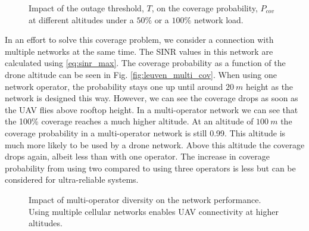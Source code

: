 \documentclass[conference,twocolumn,a4paper]{IEEEtran}
\begin{document}
\begin{figure}
	\centering
	 \resizebox{0.9\linewidth}{!}{
	
	}
	\caption{Impact of the outage threshold, $T$, on the coverage probability, $P_{cov}$ at different altitudes under a $50\%$ or a $100\%$ network load.}
	\label{fig:leuven_cov_vs_threshold}
\end{figure}

\par In an effort to solve this coverage problem, we consider a connection with multiple networks at the same time. The SINR values in this network are calculated using \eqref{eq:sinr_max}.
The coverage probability as a function of the drone altitude can be seen in Fig. \ref{fig:leuven_multi_cov}. When using one network operator, the probability stays one up until around $20~m$ height as the network is designed this way. However, we can see the coverage drops as soon as the UAV flies above rooftop height. In a multi-operator network we can see that the 100\% coverage reaches a much higher altitude. At an altitude of $100~m$ the coverage probability in a multi-operator network is still 0.99. This altitude is much more likely to be used by a drone network. Above this altitude the coverage drops again, albeit less than with one operator. The increase in coverage probability from using two compared to using three operators is less but can be considered for ultra-reliable systems. %


\begin{figure}[]
    \centering %
    
    \caption{Impact of multi-operator diversity on the network performance. Using multiple cellular networks enables UAV connectivity at higher altitudes.}
\end{figure}
\end{document}
